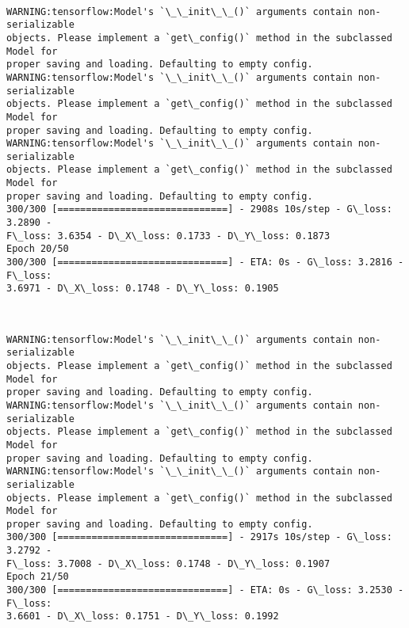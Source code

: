 \documentclass[11pt]{article}
\begin{document}
    \begin{center}
    \end{center}
    { \hspace*{\fill} \\}
    
    \begin{Verbatim}[commandchars=\\\{\}]
WARNING:tensorflow:Model's `\_\_init\_\_()` arguments contain non-serializable
objects. Please implement a `get\_config()` method in the subclassed Model for
proper saving and loading. Defaulting to empty config.
WARNING:tensorflow:Model's `\_\_init\_\_()` arguments contain non-serializable
objects. Please implement a `get\_config()` method in the subclassed Model for
proper saving and loading. Defaulting to empty config.
WARNING:tensorflow:Model's `\_\_init\_\_()` arguments contain non-serializable
objects. Please implement a `get\_config()` method in the subclassed Model for
proper saving and loading. Defaulting to empty config.
300/300 [==============================] - 2908s 10s/step - G\_loss: 3.2890 -
F\_loss: 3.6354 - D\_X\_loss: 0.1733 - D\_Y\_loss: 0.1873
Epoch 20/50
300/300 [==============================] - ETA: 0s - G\_loss: 3.2816 - F\_loss:
3.6971 - D\_X\_loss: 0.1748 - D\_Y\_loss: 0.1905
    \end{Verbatim}

    \begin{center}
    \end{center}
    { \hspace*{\fill} \\}
    
    \begin{Verbatim}[commandchars=\\\{\}]
WARNING:tensorflow:Model's `\_\_init\_\_()` arguments contain non-serializable
objects. Please implement a `get\_config()` method in the subclassed Model for
proper saving and loading. Defaulting to empty config.
WARNING:tensorflow:Model's `\_\_init\_\_()` arguments contain non-serializable
objects. Please implement a `get\_config()` method in the subclassed Model for
proper saving and loading. Defaulting to empty config.
WARNING:tensorflow:Model's `\_\_init\_\_()` arguments contain non-serializable
objects. Please implement a `get\_config()` method in the subclassed Model for
proper saving and loading. Defaulting to empty config.
300/300 [==============================] - 2917s 10s/step - G\_loss: 3.2792 -
F\_loss: 3.7008 - D\_X\_loss: 0.1748 - D\_Y\_loss: 0.1907
Epoch 21/50
300/300 [==============================] - ETA: 0s - G\_loss: 3.2530 - F\_loss:
3.6601 - D\_X\_loss: 0.1751 - D\_Y\_loss: 0.1992
    \end{Verbatim}
\end{document}
